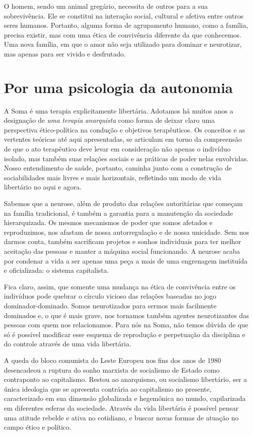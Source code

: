 O homem, sendo um animal gregário, necessita de outros para a sua
sobrevivência. Ele se constitui na interação social, cultural e afetiva
entre outros seres humanos. Portanto, alguma forma de agrupamento
humano, como a família, precisa existir, mas com uma ética de
convivência diferente da que conhecemos. Uma nova família, em que o amor
não seja utilizado para dominar e neurotizar, mas apenas para ser vivido
e desfrutado.

\section{Por uma psicologia da autonomia}

A Soma é uma terapia explicitamente libertária. Adotamos há muitos anos
a designação de \emph{uma terapia anarquista} como forma de deixar claro
uma perspectiva ético-política na condução e objetivos terapêuticos. Os
conceitos e as vertentes teóricas até aqui apresentadas, se articulam em
torno da compreensão de que o ato terapêutico deve levar em consideração
não apenas o indivíduo isolado, mas também suas relações sociais e as
práticas de poder nelas envolvidas. Nosso entendimento de saúde,
portanto, caminha junto com a construção de sociabilidades mais livres e
mais horizontais, refletindo um modo de vida libertário no aqui e agora.

Sabemos que a neurose, além de produto das relações autoritárias que
começam na família tradicional, é também a garantia para a manutenção da
sociedade hierarquizada. Os mesmos mecanismos de poder que somos
afetados e reproduzimos, nos afastam de nossa autorregulação e de nossa
unicidade. Sem nos darmos conta, também sacrificam projetos e sonhos
individuais para ter melhor aceitação das pessoas e manter a máquina
social funcionando. A neurose acaba por condenar a vida a ser apenas uma
peça a mais de uma engrenagem instituída e oficializada: o sistema
capitalista.

Fica claro, assim, que somente uma mudança na ética de convivência entre
os indivíduos pode quebrar o círculo vicioso das relações baseadas no
jogo dominador-dominado. Somos neurotizados para sermos mais facilmente
dominados e, o que é mais grave, nos tornamos também agentes
neurotizantes das pessoas com quem nos relacionamos. Para nós na Soma,
não temos dúvida de que só é possível modificar esse esquema de
reprodução e perpetuação da disciplina e do controle através de uma vida
libertária.

A queda do bloco comunista do Leste Europeu nos fins dos anos de 1980
desencadeou a ruptura do sonho marxista de socialismo de Estado como
contraponto ao capitalismo. Restou ao anarquismo, ou socialismo
libertário, ser a única ideologia que se apresenta contrária ao
capitalismo no presente, caracterizado em sua dimensão globalizada e
hegemônica no mundo, capilarizada em diferentes esferas da sociedade.
Através da vida libertária é possível pensar uma atitude rebelde e ativa
no cotidiano, e buscar novas formas de atuação no campo ético e
político.

